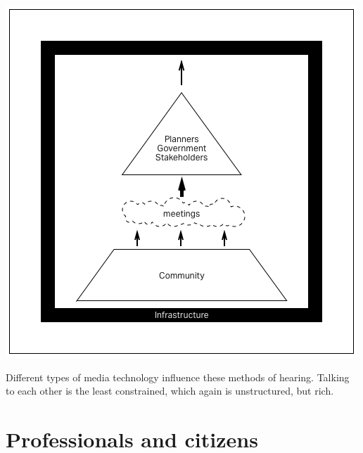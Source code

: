 \begin{marginfigure}[{0cm}]
  \includegraphics[width=\textwidth]{chapters/1/fig/hearings.png}               
\end{marginfigure}

Different types of media technology influence these methods of hearing. Talking to each other is the least constrained, which again is unstructured, but rich.

\section{Professionals and citizens}

